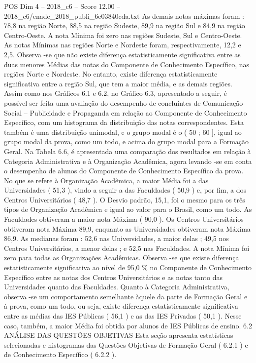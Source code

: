 \begin{textsample}{POS Dim 4 – 2018\_c6 – Score 12.00 – 2018\_c6/enade\_2018\_publi\_6e03840cda.txt}
As demais notas máximas foram : 78,8 na região Norte, 88,5 na região Sudeste, 89,9 na região Sul e 84,9 na região Centro-Oeste.
A nota Mínima foi zero nas regiões Sudeste, Sul e Centro-Oeste.
As notas Mínimas nas regiões Norte e Nordeste foram, respectivamente, 12,2 e 2,5.
Observa -se que não existe diferença estatisticamente significativa entre as duas menores Médias das notas do Componente de Conhecimento Específico, nas regiões Norte e Nordeste.
No entanto, existe diferença estatisticamente significativa entre a região Sul, que tem a maior média, e as demais regiões.
Assim como nos Gráficos 6.1 e 6.2, no Gráfico 6.3, apresentado a seguir, é possível ser feita uma avaliação do desempenho de concluintes de Comunicação Social – Publicidade e Propaganda em relação ao Componente de Conhecimento Específico, com um histograma da distribuição das notas correspondentes.
Esta também é uma distribuição unimodal, e o grupo modal é o ( 50 ; 60 ], igual ao grupo modal da prova, como um todo, e acima do grupo modal para a Formação Geral.
Na Tabela 6.6, é apresentada uma comparação dos resultados em relação à Categoria Administrativa e à Organização Acadêmica, agora levando -se em conta o desempenho de alunos do Componente de Conhecimento Específico da prova.
No que se refere à Organização Acadêmica, a maior Média foi a das Universidades ( 51,3 ), vindo a seguir a das Faculdades ( 50,9 ) e, por fim, a dos Centros Universitários ( 48,7 ).
O Desvio padrão, 15,1, foi o mesmo para os três tipos de Organização Acadêmica e igual ao valor para o Brasil, como um todo.
As Faculdades obtiveram a maior nota Máxima ( 90,0 ).
Os Centros Universitários obtiveram nota Máxima 89,9, enquanto as Universidades obtiveram nota Máxima 86,9.
As medianas foram : 52,6 nas Universidades, a maior delas ; 49,5 nos Centros Universitários, a menor delas ; e 52,5 nas Faculdades.
A nota Mínima foi zero para todas as Organizações Acadêmicas.
Observa -se que existe diferença estatisticamente significativa ao nível de 95,0 \% no Componente de Conhecimento Específico entre as notas dos Centros Universitários e as notas tanto das Universidades quanto das Faculdades.
Quanto à Categoria Administrativa, observa -se um comportamento semelhante àquele da parte de Formação Geral e à prova, como um todo, ou seja, existe diferença estatisticamente significativa entre as médias das IES Públicas ( 56,1 ) e as das IES Privadas ( 50,1 ).
Nesse caso, também, a maior Média foi obtida por alunos de IES Públicas de ensino. 6.2 ANÁLISE DAS QUESTÕES OBJETIVAS Esta seção apresenta estatísticas selecionadas e histogramas das Questões Objetivas de Formação Geral ( 6.2.1 ) e de Conhecimento Específico ( 6.2.2 ).

\end{textsample}
